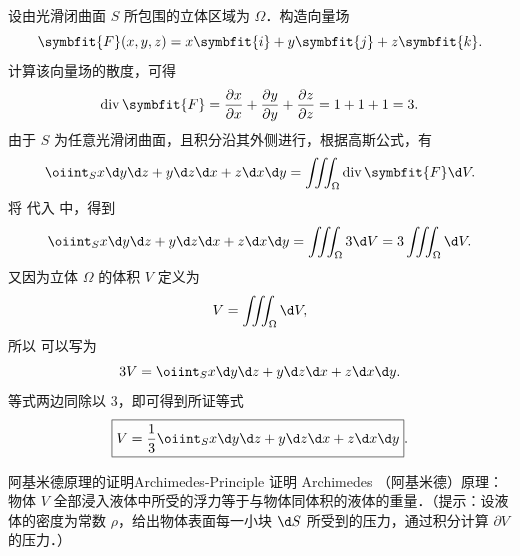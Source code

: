 \begin{myproof}
    设由光滑闭曲面 $S$ 所包围的立体区域为 $\Omega$．构造向量场
    \begin{equation}
        \label{eq:vec-field}
        \symbfit{F}(x,y,z) = x \symbfit{i} + y \symbfit{j} + z \symbfit{k}.
    \end{equation}
    计算该向量场的散度，可得
    \begin{equation}
        \label{eq:div-calc}
        \operatorname{div} \symbfit{F} = \frac{\partial x}{\partial x} + \frac{\partial y}{\partial y} + \frac{\partial z}{\partial z} = 1 + 1 + 1 = 3.
    \end{equation}
    由于 $S$ 为任意光滑闭曲面，且积分沿其外侧进行，根据高斯公式，有
    \begin{equation}
        \label{eq:gauss-app-1}
        \oiint_S x \d y \d z + y \d z \d x + z \d x \d y = \iiint_\Omega \operatorname{div} \symbfit{F} \d V.
    \end{equation}
    将  代入  中，得到
    \begin{equation}
        \label{eq:vol-rel}
        \oiint_S x \d y \d z + y \d z \d x + z \d x \d y = \iiint_\Omega 3 \d V = 3 \iiint_\Omega \d V.
    \end{equation}
    又因为立体 $\Omega$ 的体积 $V$ 定义为
    \begin{equation}
        \label{eq:vol-def}
        V = \iiint_\Omega \d V,
    \end{equation}
    所以  可以写为
    \begin{equation}
        \label{eq:final-proof}
        3V = \oiint_S x \d y \d z + y \d z \d x + z \d x \d y.
    \end{equation}
    等式两边同除以 $3$，即可得到所证等式
    \begin{equation}
        \label{eq:result-1}
        \boxed{V = \frac{1}{3} \oiint_S x \d y \d z + y \d z \d x + z \d x \d y}.
    \end{equation}
\end{myproof}

\begin{problem}{阿基米德原理的证明}{Archimedes-Principle}
    证明 Archimedes （阿基米德）原理：物体 $V$ 全部浸入液体中所受的浮力等于与物体同体积的液体的重量．（提示：设液体的密度为常数 $\rho$，给出物体表面每一小块 $\d S$ 所受到的压力，通过积分计算 $\partial V$ 的压力．）
\end{problem}


